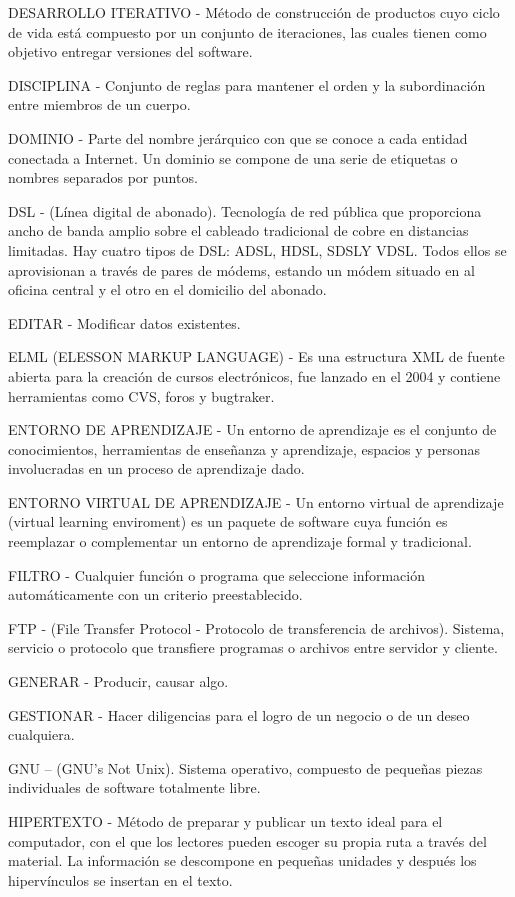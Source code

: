 DESARROLLO ITERATIVO - Método de construcción de productos cuyo ciclo de vida está compuesto por un conjunto de iteraciones, las cuales tienen como objetivo entregar versiones del software.

DISCIPLINA - Conjunto de reglas para mantener el orden y la subordinación entre miembros de un cuerpo.

DOMINIO - Parte del nombre jerárquico con que se conoce a cada entidad conectada a Internet. Un dominio se compone de una serie de etiquetas o nombres separados por puntos.

DSL -  (Línea digital de abonado). Tecnología de red pública que proporciona ancho de banda amplio sobre el cableado tradicional de cobre en distancias limitadas. Hay cuatro tipos de DSL: ADSL, HDSL, SDSLY VDSL. Todos ellos se aprovisionan a través de pares de módems, estando un módem situado en al oficina central y el otro en el domicilio del abonado.

EDITAR - Modificar datos existentes.

ELML (ELESSON MARKUP LANGUAGE) - Es una estructura XML de fuente abierta para la creación de cursos electrónicos, fue lanzado en el 2004 y contiene herramientas como CVS, foros y bugtraker.

ENTORNO DE APRENDIZAJE - Un entorno de aprendizaje es el conjunto de conocimientos, herramientas de enseñanza y aprendizaje, espacios y personas involucradas en un proceso de aprendizaje dado.

ENTORNO VIRTUAL DE APRENDIZAJE - Un entorno virtual de aprendizaje (virtual learning enviroment) es un paquete de software cuya función es reemplazar o complementar un entorno de aprendizaje formal y tradicional.


FILTRO - Cualquier función o programa que seleccione información automáticamente con un criterio preestablecido.

FTP - (File Transfer Protocol  - Protocolo de transferencia de archivos). Sistema, servicio o protocolo que transfiere programas o archivos entre servidor y cliente.

GENERAR - Producir, causar algo.

GESTIONAR - Hacer diligencias para el logro de un negocio o de un deseo cualquiera.

GNU – (GNU’s Not Unix). Sistema operativo, compuesto de pequeñas piezas individuales de software totalmente libre.

HIPERTEXTO - Método de preparar y publicar un texto ideal para el computador, con el que los lectores pueden escoger su propia ruta a través del material. La información se descompone en pequeñas unidades y después los hipervínculos se insertan en el texto.


